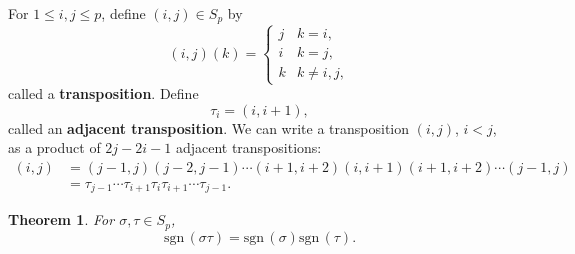 \documentclass{amsart}
\newcommand{\sgn}{\mathrm{sgn}\,}
\newtheorem{theorem}{Theorem}
\theoremstyle{definition}
\begin{document}
For $1 \leq i, j \leq p$, define $(i,j) \in S_p$ by
\[
(i,j)(k) = \begin{cases}
j&k=i,\\
i&k=j,\\
k&k \neq i,j,
\end{cases}
\]
called a \textbf{transposition}.
Define
\[
\tau_i = (i,i+1),
\]
called an \textbf{adjacent transposition}.
We can write a transposition $(i,j)$, $i<j$, as a product of $2j-2i-1$ adjacent transpositions:
\begin{align*}
(i,j) & = (j-1,j)(j-2,j-1)\cdots(i+1,i+2)(i,i+1)(i+1,i+2)\cdots(j-1,j)\\
&=\tau_{j-1} \cdots \tau_{i+1} \tau_i \tau_{i+1} \cdots \tau_{j-1}.
\end{align*}

\begin{theorem}
For $\sigma,\tau \in S_p$,
\[
\sgn(\sigma \tau) = \sgn(\sigma) \sgn(\tau).
\]
\label{sgnhomo}
\end{theorem}
\end{document}
